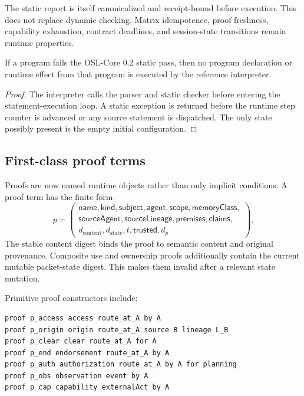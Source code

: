 The static report is itself canonicalized and receipt-bound before execution.
This does not replace dynamic checking.  Matrix idempotence, proof freshness,
capability exhaustion, contract deadlines, and session-state transitions remain
runtime properties.

\begin{proposition}
If a program fails the OSL-Core 0.2 static pass, then no program declaration or
runtime effect from that program is executed by the reference interpreter.
\end{proposition}

\begin{proof}
The interpreter calls the parser and static checker before entering the
statement-execution loop.  A static exception is returned before the runtime
step counter is advanced or any source statement is dispatched.  The only
state possibly present is the empty initial configuration.
\end{proof}

\subsection{First-class proof terms}

Proofs are now named runtime objects rather than only implicit conditions.  A
proof term has the finite form
\[
 p=
 \left(
 \begin{array}{l}
 \mathsf{name},\mathsf{kind},\mathsf{subject},\mathsf{agent},
 \mathsf{scope},\mathsf{memoryClass},\\
 \mathsf{sourceAgent},\mathsf{sourceLineage},
 \mathsf{premises},\mathsf{claims},\\
 d_{\mathrm{content}},d_{\mathrm{state}},t,
 \mathsf{trusted},d_p
 \end{array}
 \right).
\]
The stable content digest binds the proof to semantic content and original
provenance.  Composite use and ownership proofs additionally contain the
current mutable packet-state digest.  This makes them invalid after a relevant
state mutation.

Primitive proof constructors include:
\begin{lstlisting}[style=osl]
proof p_access access route_at_A by A
proof p_origin origin route_at_A source B lineage L_B
proof p_clear clear route_at_A for A
proof p_end endorsement route_at_A by A
proof p_auth authorization route_at_A by A for planning
proof p_obs observation event by A
proof p_cap capability externalAct by A
\end{lstlisting}

